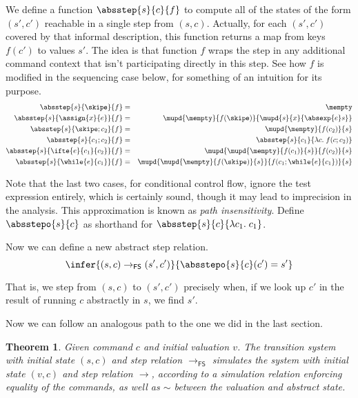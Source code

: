 \documentclass{amsbook}
\newtheorem{theorem}{Theorem}[chapter]
\theoremstyle{definition}
\theoremstyle{remark}
\numberwithin{section}{chapter}
\numberwithin{equation}{chapter}
\begin{document}
We define a function $\absstep{s}{c}{f}$ to compute all of the states of the form $(s', c')$ reachable in a single step from $(s, c)$.
Actually, for each $(s', c')$ covered by that informal description, this function returns a map from keys $f(c')$ to values $s'$.
The idea is that function $f$ wraps the step in any additional command context that isn't participating directly in this step.
See how $f$ is modified in the sequencing case below, for something of an intuition for its purpose.
\begin{eqnarray*}
  \absstep{s}{\skipe}{f} &=& \mempty \\
  \absstep{s}{\assign{x}{e}}{f} &=& \mupd{\mempty}{f(\skipe)}{\mupd{s}{x}{\absexp{e}s}} \\
  \absstep{s}{\skipe; c_2}{f} &=& \mupd{\mempty}{f(c_2)}{s} \\
  \absstep{s}{c_1; c_2}{f} &=& \absstep{s}{c_1}{\lambda c. \; f(c; c_2)} \\
  \absstep{s}{\ifte{e}{c_1}{c_2}}{f} &=& \mupd{\mupd{\mempty}{f(c_1)}{s}}{f(c_2)}{s} \\
  \absstep{s}{\while{e}{c_1}}{f} &=& \mupd{\mupd{\mempty}{f(\skipe)}{s}}{f(c_1; \while{e}{c_1})}{s}
\end{eqnarray*}

Note that the last two cases, for conditional control flow, ignore the test expression entirely, which is certainly sound, though it may lead to imprecision in the analysis.
This approximation is known as \emph{path insensitivity}.
Define $\absstepo{s}{c}$ as shorthand for $\absstep{s}{c}{\lambda c_1. \; c_1}$.

Now we can define a new abstract step relation.
$$\infer{(s, c) \to_\mathsf{FS} (s', c')}{
  \absstepo{s}{c}(c') = s'
}$$

That is, we step from $(s, c)$ to $(s', c')$ precisely when, if we look up $c'$ in the result of running $c$ abstractly in $s$, we find $s'$.

Now we can follow an analogous path to the one we did in the last section.

\begin{theorem}\label{flow_sensitive_abstraction}
  \abstraction
  Given command $c$ and initial valuation $v$.  The transition system with initial state $(s, c)$ and step relation $\to_\mathsf{FS}$ simulates the system with initial state $(v, c)$ and step relation $\to$, according to a simulation relation enforcing equality of the commands, as well as $\sim$ between the valuation and abstract state.
\end{theorem}
\end{document}
